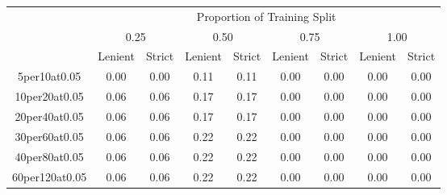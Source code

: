 \documentclass[12pt]{article}
\begin{document}
\begin{table}[]
    \begin{tabular}{|c|cc|cc|cc|cc|}
        \hline
        \textbf{}       & \multicolumn{8}{c|}{Proportion of Training Split}                                                                                                                                                                                          \\
                        & \multicolumn{2}{c}{0.25}                                 & \multicolumn{2}{c}{0.50}                                 & \multicolumn{2}{c}{0.75}                                 & \multicolumn{2}{c|}{1.00}                                 \\
                        & \multicolumn{1}{c}{Lenient} & \multicolumn{1}{c}{Strict} & \multicolumn{1}{c}{Lenient} & \multicolumn{1}{c}{Strict} & \multicolumn{1}{c}{Lenient} & \multicolumn{1}{c}{Strict} & \multicolumn{1}{c}{Lenient} & \multicolumn{1}{c|}{Strict} \\ \hline
        5per10at0.05    & 0.00                        & 0.00                       & 0.11                        & 0.11                       & 0.00                        & 0.00                       & 0.00                        & 0.00                       \\
        10per20at0.05   & 0.06                        & 0.06                       & 0.17                        & 0.17                       & 0.00                        & 0.00                       & 0.00                        & 0.00                       \\
        20per40at0.05   & 0.06                        & 0.06                       & 0.17                        & 0.17                       & 0.00                        & 0.00                       & 0.00                        & 0.00                       \\
        30per60at0.05   & 0.06                        & 0.06                       & 0.22                        & 0.22                       & 0.00                        & 0.00                       & 0.00                        & 0.00                       \\
        40per80at0.05   & 0.06                        & 0.06                       & 0.22                        & 0.22                       & 0.00                        & 0.00                       & 0.00                        & 0.00                       \\
        60per120at0.05  & 0.06                        & 0.06                       & 0.22                        & 0.22                       & 0.00                        & 0.00                       & 0.00                        & 0.00                       \\

\end{tabular}
\end{table}
\end{document}
